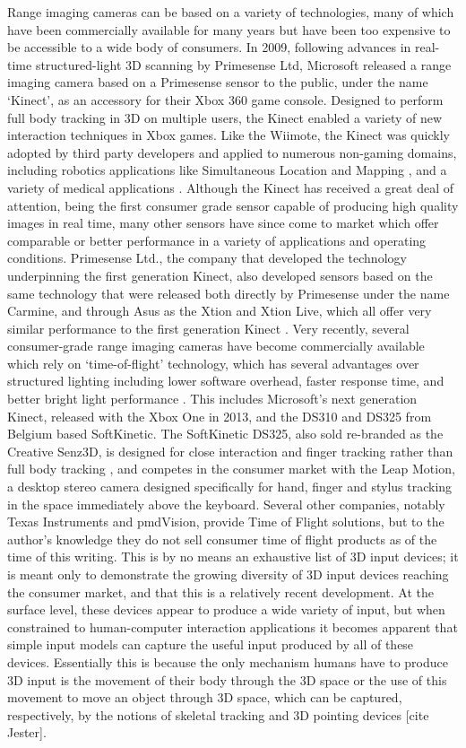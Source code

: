 Range imaging cameras can be based on a variety of technologies, many of which have been commercially available for many years but have been too expensive to be accessible to a wide body of consumers. In 2009, following advances in real-time structured-light 3D scanning by Primesense Ltd, Microsoft released a range imaging camera based on a Primesense sensor to the public, under the name ‘Kinect’, as an accessory for their Xbox 360 game console. Designed to perform full body tracking in 3D on multiple users, the Kinect enabled a variety of new interaction techniques in Xbox games. Like the Wiimote, the Kinect was quickly adopted by third party developers and applied to numerous non-gaming domains, including robotics applications like Simultaneous Location and Mapping \cite{iser-rgbd-slam}, and a variety of medical applications \cite{kinect-medical}. Although the Kinect has received a great deal of attention, being the first consumer grade sensor capable of producing high quality images in real time, many other sensors have since come to market which offer comparable or better performance in a variety of applications and operating conditions. Primesense Ltd., the company that developed the technology underpinning the first generation Kinect, also developed sensors based on the same technology that were released both directly by Primesense under the name Carmine, and through Asus as the Xtion  and Xtion Live, which all offer very similar performance to the first generation Kinect \cite{depth-sensor-comparison}. Very recently, several consumer-grade range imaging cameras have become commercially available which rely on ‘time-of-flight’ technology, which has several advantages over structured lighting including lower software overhead, faster response time, and better bright light performance \cite{ti-tof}. This includes Microsoft’s next generation Kinect, released with the Xbox One in 2013, and the DS310 and DS325 from Belgium based SoftKinetic. The SoftKinetic DS325, also sold re-branded as the Creative Senz3D, is designed for close interaction and finger tracking rather than full body tracking \cite{softkinetc-products}, and competes in the consumer market with the Leap Motion, a desktop stereo camera designed specifically for hand, finger and stylus tracking in the space immediately above the keyboard. Several other companies, notably Texas Instruments and pmdVision, provide Time of Flight solutions, but to the author’s knowledge they do not sell consumer time of flight products as of the time of this writing. 
This is by no means an exhaustive list of 3D input devices; it is meant only to demonstrate the growing diversity of 3D input devices reaching the consumer market, and that this is a relatively recent development. At the surface level, these devices appear to produce a wide variety of input, but when constrained to human-computer interaction applications it becomes apparent that simple input models can capture the useful input produced by all of these devices. Essentially this is because the only mechanism humans have to produce 3D input is the movement of their body through the 3D space or the use of this movement to move an object through 3D space, which can be captured, respectively, by the notions of skeletal tracking and 3D pointing devices [cite Jester].

